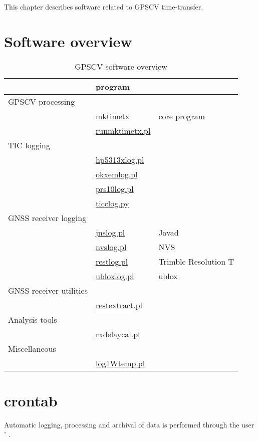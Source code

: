 
This chapter describes software related to GPSCV time-transfer.

\section{Software overview}


\begin{table}[h]
\begin{tabular}{l|l|l}
	& program & \\ 
	\hline
GPSCV processing  &  & \\
	& \hyperlink{h:mktimetx}{mktimetx} & core program\\
	& \hyperlink{h:runmktimetx}{runmktimetx.pl} & \\
	\hline
TIC logging & & \\
	& \hyperlink{h:hp5313xlog}{hp5313xlog.pl} &\\
	& \hyperlink{h:okxemlog}{okxemlog.pl} & \\
	& \hyperlink{h:prs10log}{prs10log.pl} & \\
	& \hyperlink{h:ticclog}{ticclog.py} & \\
	\hline
GNSS receiver logging & & \\
	&	\hyperlink{h:jnslog}{jnslog.pl} & Javad\\
	& \hyperlink{h:nvslog}{nvslog.pl} & NVS\\
	& \hyperlink{h:restlog}{restlog.pl} & Trimble Resolution T\\
	& \hyperlink{h:ubloxlog}{ubloxlog.pl} & ublox\\
GNSS receiver utilities & & \\
	& \hyperlink{h:restextract}{restextract.pl} & \\
	\hline
Analysis tools & & \\
	& \hyperlink{h:rxdelaycal}{rxdelaycal.pl} & \\
Miscellaneous & & \\
  & \hyperlink{h:log1Wtemp}{log1Wtemp.pl} & \\ 
	\hline
\end{tabular}
\caption{GPSCV software overview}
\end{table}

\section{crontab \label{ss:crontab}}

Automatic logging, processing and archival of data is performed through the user ' .

